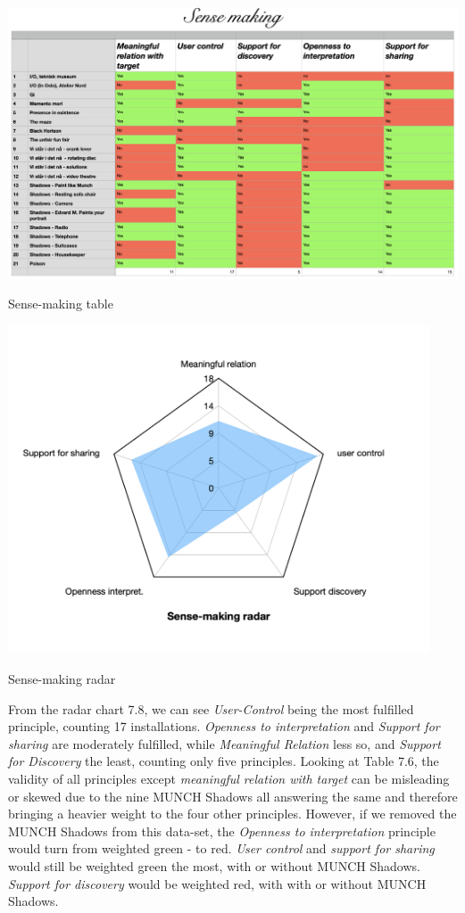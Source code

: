\begin{table}[H]
    \centering 
    \includegraphics[width=20cm, angle=90]{pictures/analysis/sense.png}
    \caption{Sense-making table}
\end{table}

\begin{table}[H]
    \centering 
    \includegraphics[width=12.5cm]{pictures/analysis/sense_radar.png}
    \caption{Sense-making radar}
\end{table}


From the radar chart 7.8, we can see \textit{User-Control} being the most fulfilled principle, counting 17 installations. \textit{Openness to interpretation} and \textit{Support for sharing} are moderately fulfilled, while \textit{Meaningful Relation} less so, and \textit{Support for Discovery} the least, counting only five principles. Looking at Table 7.6, the validity of all principles except \emph{meaningful relation with target} can be misleading or skewed due to the nine MUNCH Shadows all answering the same and therefore bringing a heavier weight to the four other principles. However, if we removed the MUNCH Shadows from this data-set, the \textit{Openness to interpretation} principle would turn from weighted green - to red. \emph{User control} and \emph{support for sharing} would still be weighted green the most, with or without MUNCH Shadows. \emph{Support for discovery} would be weighted red, with with or without MUNCH Shadows.


